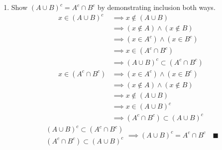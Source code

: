 \documentclass[12pt]{article}
\newcommand{\qed}{\quad \blacksquare}
\begin{document}
\begin{enumerate}
        \item Show $(A \cup B)^c = A^c \cap B^c$ by demonstrating inclusion both ways.
            \color{blue}
                \begin{align*}
                    x \in (A \cup B)^c &\implies x \notin (A \cup B)\\ 
                        &\implies (x \notin A) \land (x \notin B)\\ 
                        &\implies (x \in A^c) \land (x \in B^c)\\ 
                        &\implies x \in (A^c \cap B^c)\\ 
                        &\implies (A \cup B)^c \subset (A^c \cap B^c)\\ 
                    x \in (A^c \cap B^c) &\implies (x \in A^c) \land (x \in B^c)\\ 
                        &\implies (x \notin A) \land (x \notin B)\\ 
                        &\implies x \notin (A \cup B)\\ 
                        &\implies x \in (A \cup B)^c\\ 
                        &\implies (A^c \cap B^c) \subset (A \cup B)^c
                \end{align*}
                \[\begin{array}{c}
                    (A \cup B)^c \subset (A^c \cap B^c)\\ 
                    (A^c \cap B^c) \subset (A \cup B)^c 
                \end{array} \implies (A \cup B)^c = A^c \cap B^c \qed\]
            \color{black}
    \end{enumerate}
    
\pagebreak 
\end{document}
